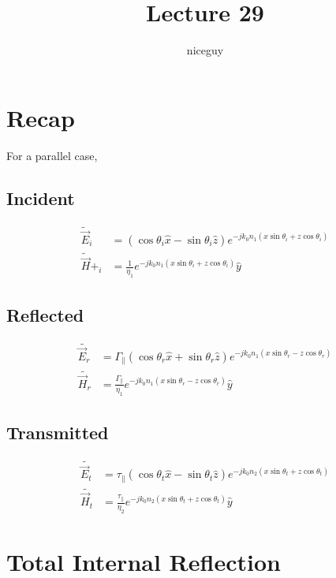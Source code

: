 \documentclass[12pt]{article}
\title{Lecture 29}
\author{niceguy}
\begin{document}
\maketitle

\section{Recap}

For a parallel case,

\subsection{Incident}

\begin{align*}
    \tilde{\vec E}_i &= (\cos\theta_i\hat x - \sin\theta_i\hat z)e^{-jk_0n_1(x\sin\theta_i + z\cos\theta_i)} \\
    \tilde{\vec H}+_i &= \frac{1}{\eta_1}e^{-jk_0n_1(x\sin\theta_i + z\cos\theta_i)} \hat y
\end{align*}

\subsection{Reflected}

\begin{align*}
    \tilde{\vec E_r} &= \Gamma_\parallel (\cos\theta_r\hat x + \sin\theta_r\hat z)e^{-jk_0n_1(x\sin\theta_r - z\cos\theta_r)} \\
    \tilde{\vec H_r} &= \frac{\Gamma_\parallel}{\eta_1} e^{-jk_0n_1(x\sin\theta_r - z\cos\theta_r)} \hat y
\end{align*}

\subsection{Transmitted}

\begin{align*}
    \tilde{\vec E_t} &= \tau_\parallel(\cos\theta_t \hat x - \sin\theta_t\hat z)e^{-jk_0n_2(x\sin\theta_t + z\cos\theta_t)} \\
    \tilde{\vec H_t} &= \frac{\tau_\parallel}{\eta_2} e^{-jk_0n_2(x\sin\theta_t + z\cos\theta_t)} \hat y
\end{align*}

\section{Total Internal Reflection}
\end{document}
